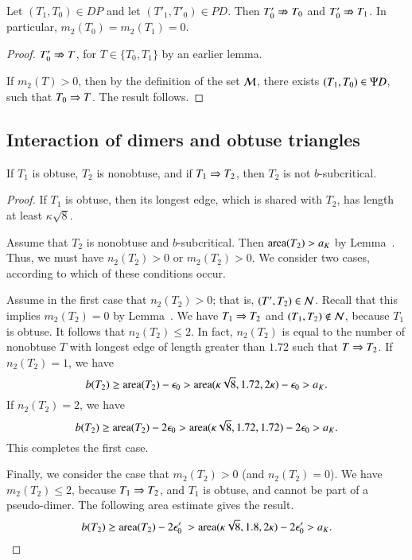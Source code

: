 \begin{lemma}\label{lemma:m2-dimer}  Let $(T_1,T_0)\in DP$ and let $(T'_1,T'_0)\in PD$.  Then $T'_0\nRightarrow T_0$ and
$T'_0 \nRightarrow T_1$.  In particular, $m_2(T_0)=m_2(T_1)=0$.
\end{lemma}

\begin{proof}  $T'_0\nRightarrow T$, for $T\in\{T_0,T_1\}$ by an earlier lemma.

If $m_2(T)>0$, then by the definition of the set $\mathcal M$,  there exists $(T_1,T_0)\in \Psi D$, such that $T_0\Rightarrow T$.
The result follows.
\end{proof}

\subsection{Interaction of dimers and obtuse triangles}




\begin{lemma}
  If $T_1$ is obtuse, $T_2$ is nonobtuse, and if $T_1 \Rightarrow T_2$, then $T_2$ is not
  $b$-subcritical.
\end{lemma}


\begin{proof} 
  If $T_1$ is obtuse, then its longest edge, which is shared with
  $T_2$, has length at least $\kappa\sqrt8$.

  Assume that $T_2$ is nonobtuse and $b$-subcritical.  Then ${\operatorname{area}}(T_2) > a_K$ by
  Lemma~.  Thus, we must have $n_2(T_2)>0$ or $m_2(T_2)>0$.
  We consider two cases, according to which of these conditions occur.

 Assume in the first case that $n_2(T_2)>0$; that is, $(T',T_2)\in \mathcal N$.  Recall that this
 implies $m_2(T_2)=0$ by Lemma~.
  We have $T_1\Rightarrow T_2$ and $(T_1,T_2)\not\in \mathcal N$, because $T_1$ is obtuse.  
  It follows that $n_2(T_2)\le 2$.  In fact, $n_2(T_2)$ is equal to the number of
  nonobtuse $T$ with longest edge of length greater than $1.72$ such that $T\Rightarrow T_2$.
  If $n_2(T_2)=1$, we have
  \[
b(T_2) \ge {\operatorname{area}}(T_2) - \epsilon_0 > {\operatorname{area}}(\kappa\sqrt8,1.72,2\kappa)  - \epsilon_0 > a_K.
\]
If $n_2(T_2)=2$, we have
  \[
b(T_2) \ge {\operatorname{area}}(T_2) - 2\epsilon_0 > {\operatorname{area}}(\kappa\sqrt8,1.72,1.72)  - 2\epsilon_0 > a_K.
\]
  This completes the first case.

  Finally, we consider the case that $m_2(T_2)>0$ (and $n_2(T_2)=0$).
  We have $m_2(T_2)\le 2$, because $T_1\Rightarrow T_2$, and $T_1$ is obtuse, and cannot be
part of a pseudo-dimer.
  The following area estimate gives the result.
  \[
b(T_2) \ge {\operatorname{area}}(T_2) - 2\epsilon_0'\ > {\operatorname{area}}(\kappa\sqrt8,1.8,2\kappa)  - 2\epsilon_0' > a_K.
\]
\end{proof}


